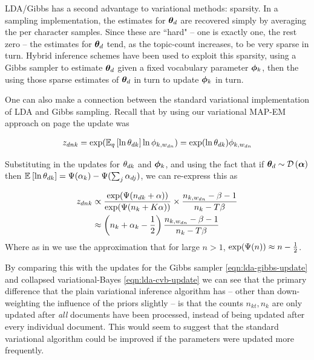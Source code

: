 LDA/Gibbs has a second advantage to variational methods: sparsity. In a sampling implementation, the estimates for ${ \bm \theta_d }$ are recovered simply by averaging the per character samples. Since these are ``hard" -- one is exactly one, the rest zero  -- the estimates for ${ \bm \theta_d }$ tend, as the topic-count increases, to be very sparse in turn. Hybrid inference schemes have been used\cite{Mimno2012a} to exploit this sparsity, using a Gibbs sampler to estimate ${ \bm \theta_d }$ given a fixed vocabulary parameter $\bm \phi_k$, then the using those sparse estimates of ${ \bm \theta_d }$ in turn to update $\bm \phi_k$ in turn.

One can also make a connection between the standard variational implementation of LDA and Gibbs sampling. Recall that by using our variational MAP-EM approach on page \pageref{sec:chap1:lda} the update was

\begin{align}
z_{dnk} = \exp(\mathbb{E}_{ { q } }\left[ \ln { \theta_{dk} } \right] \ln \phi_{k,w_{dn}}) = \exp(\ln { \theta_{dk} })\phi_{k,w_{dn}}
\end{align}

Substituting in the updates for ${ \theta_{dk} }$ and $\bm \phi_k$, and using the fact that if ${ \bm \theta_d } \sim \mathcal{D} \left( {\bm \alpha} \right)$ then $\mathbb{E}_{ {  } }\left[ \ln { \theta_{dk} } \right] = \Psi(\alpha_k) - \Psi(\sum_j \alpha_{dj})$, we can re-express this as

\begin{align}
z_{dnk} &\propto \frac{\exp(\Psi(n_{dk} + \alpha))}{\exp(\Psi(n_k + K \alpha))}\times\frac{n_{k,w_{dn}} - \beta - 1}{n_k - T \beta}  \\
&\approx \left(n_k + \alpha_k - \frac{1}{2}\right) \frac{n_{k,w_{dn}} - \beta - 1}{n_k - T \beta}
\end{align}
Where as in\cite{Asuncion2012} we use the approximation that for large $n > 1$, $\exp(\Psi(n)) \approx n - \frac{1}{2}$. 

By comparing this with the updates for the Gibbs sampler \eqref{eqn:lda-gibbs-update} and collapsed variational-Bayes \eqref{eqn:lda-cvb-update} we can see that the primary difference that the plain variational inference algorithm has -- other than down-weighting the influence of the priors slightly -- is that the counts $n_{kt}, n_{k}$ are only updated after \emph{all} documents have been processed, instead of being updated after every individual document. This would seem to suggest that the standard variational algorithm could be improved if the parameters were updated more frequently.

